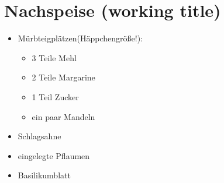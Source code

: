 \section{Nachspeise (working title)}
	\begin{itemize}
		\item Mürbteigplätzen(Häppchengröße!):
			\begin{itemize}
				\item 3 Teile Mehl
				\item 2 Teile Margarine
				\item 1 Teil Zucker
				\item ein paar Mandeln
			\end{itemize}
		\item Schlagsahne
		\item eingelegte Pflaumen  %
		\item Basilikumblatt
	\end{itemize}